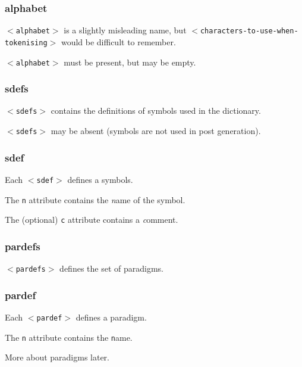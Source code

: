 \documentclass{beamer} %
\begin{document}
\begin{frame}
  \frametitle{alphabet}

  {\tt $<$alphabet$>$} is a slightly misleading name, but
  {\tt $<$characters-to-use-when-tokenising$>$} would be 
  difficult to remember.

  {\tt $<$alphabet$>$} must be present, but may be empty.
\end{frame}

\begin{frame}
  \frametitle{sdefs}

  {\tt $<$sdefs$>$} contains the definitions of symbols used
  in the dictionary.

  {\tt $<$sdefs$>$} may be absent (symbols are not used
  in post generation).
\end{frame}

\begin{frame}
  \frametitle{sdef}

  Each {\tt $<$sdef$>$} defines a symbols.

  The {\tt n} attribute contains the {\it n}ame of the symbol.

  The (optional) {\tt c} attribute contains a {\it c}omment.

\end{frame}

\begin{frame}
  \frametitle{pardefs}

  {\tt $<$pardefs$>$} defines the set of paradigms.

\end{frame}

\begin{frame}
  \frametitle{pardef}

  Each {\tt $<$pardef$>$} defines a paradigm.

  The {\tt n} attribute contains the {\tt n}ame.

  \pause

  More about paradigms later.

\end{frame}
\end{document}
